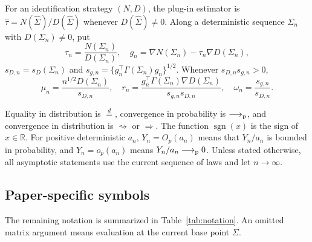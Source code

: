 \documentclass[12pt,a4paper]{article}
\theoremstyle{plain}
\theoremstyle{definition}
\newcommand{\R}{\mathbb{R}}
\newcommand{\sgn}{\operatorname{sgn}}
\newcommand{\pto}{\longrightarrow_{\rm p}}
\newcommand{\dto}{\rightsquigarrow}
\newcommand{\Sighat}{\hat{\Sigma}}
\begin{document}
For an identification strategy $(N,D)$, the plug-in estimator is $\hat{\tau}=N(\Sighat)/D(\Sighat)$ whenever $D(\Sighat)\ne0$.
Along a deterministic sequence $\Sigma_n$ with $D(\Sigma_n)\ne0$, put
\begin{equation*}
    \tau_n
    =
    \frac{N(\Sigma_n)}{D(\Sigma_n)}
    ,\quad
    g_n
    =
    \nabla N(\Sigma_n)-\tau_n\nabla D(\Sigma_n)
    ,
\end{equation*}
$s_{D,n}=s_D(\Sigma_n)$ and $s_{g,n}=\{g_n^\top\Gamma(\Sigma_n)g_n\}^{1/2}$.
Whenever $s_{D,n}s_{g,n}>0$,
\begin{equation*}
    \mu_n
    =
    \frac{n^{1/2}D(\Sigma_n)}{s_{D,n}}
    ,\quad
    r_n
    =
    \frac{g_n^\top\Gamma(\Sigma_n)\nabla D(\Sigma_n)}{s_{g,n}s_{D,n}}
    ,\quad
    \omega_n
    =
    \frac{s_{g,n}}{s_{D,n}}
    .
\end{equation*}

Equality in distribution is $\stackrel d=$, convergence in probability is $\pto$, and convergence in distribution is $\dto$ or $\Rightarrow$.
The function $\sgn(x)$ is the sign of $x\in\R$.
For positive deterministic $a_n$, $Y_n=O_p(a_n)$ means that $Y_n/a_n$ is bounded in probability, and $Y_n=o_p(a_n)$ means $Y_n/a_n\pto0$.
Unless stated otherwise, all asymptotic statements use the current sequence of laws and let $n\to\infty$.

\subsection{Paper-specific symbols}

The remaining notation is summarized in Table~\ref{tab:notation}.
An omitted matrix argument means evaluation at the current base point $\Sigma$.
\end{document}
